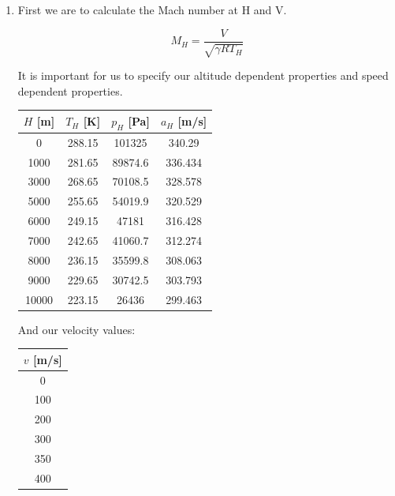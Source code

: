 \documentclass[titlepage]{article}
\begin{document}
\begin{enumerate}
  \item First we are to calculate the Mach number at H and V.
  
  \begin{equation}
    M_{H} = \frac{V}{\sqrt{\gamma R T_{H}}}
  \end{equation}

  It is important for us to specify our altitude dependent properties and speed dependent properties.

  \begin{center}
    \begin{tabular}{|c|c|c|c|}
      \hline
      $H$ [m] & $T_{H}$ [K] & $p_{H}$ [Pa] & $a_{H}$ [m/s] \\
      \hline
      0 & 288.15 & 101325 & 340.29 \\
      \hline
      1000 & 281.65 & 89874.6	& 336.434 \\
      \hline
      3000	& 268.65	& 70108.5	& 328.578 \\
      \hline
      5000	& 255.65	& 54019.9	& 320.529 \\
      \hline
      6000	& 249.15	& 47181 &	316.428 \\
      \hline
      7000 &	242.65	& 41060.7	& 312.274 \\
      \hline
      8000	& 236.15	& 35599.8	& 308.063 \\
      \hline
      9000	& 229.65	& 30742.5 &	303.793 \\
      \hline
      10000	& 223.15	& 26436	& 299.463 \\
      \hline
    \end{tabular}
  \end{center}

  And our velocity values:

  \begin{center}
    \begin{tabular}{|c|}
      \hline
      $v$ [m/s] \\
      \hline
      0 \\
      \hline
      100 \\
      \hline
      200 \\
      \hline
      300 \\
      \hline
      350 \\
      \hline
      400 \\
      \hline
    \end{tabular}
  \end{center}


\end{enumerate}
\end{document}

